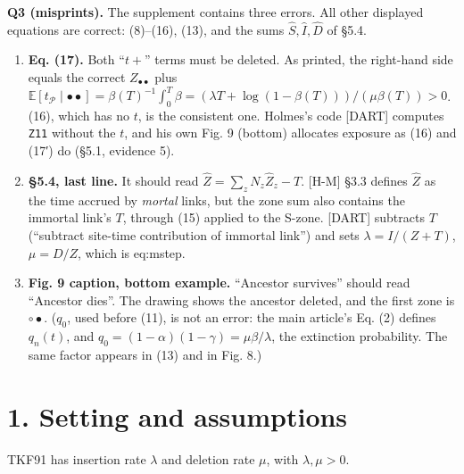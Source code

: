 \documentclass[10pt,]{article}
\providecommand{\tightlist}{%
  \setlength{\itemsep}{0pt}\setlength{\parskip}{0pt}}
\begin{document}
\textbf{Q3 (misprints).} The supplement contains three errors. All other
displayed equations are correct: (8)--(16), (13), and the sums
\(\hat S,\hat I,\hat D\) of §5.4.

\begin{enumerate}
\def\labelenumi{\arabic{enumi}.}
\tightlist
\item
  \textbf{Eq. (17).} Both ``\(t+\)'' terms must be deleted. As printed,
  the right-hand side equals the correct \(Z_{\bullet\bullet}\) plus
  \(\mathbb E[t_{\mathcal P}\mid\bullet\bullet]=\beta(T)^{-1}\int_0^T\beta=(\lambda T+\log(1-\beta(T)))/(\mu\beta(T))>0\).
  (16), which has no \(t\), is the consistent one. Holmes's code
  {[}DART{]} computes \texttt{Z11} without the \(t\), and his own Fig. 9
  (bottom) allocates exposure as (16) and (17′) do (§5.1, evidence 5).
\item
  \textbf{§5.4, last line.} It should read
  \(\hat Z=\sum_zN_z\hat Z_z-T\). {[}H-M{]} §3.3 defines \(\hat Z\) as
  the time accrued by \emph{mortal} links, but the zone sum also
  contains the immortal link's \(T\), through (15) applied to the
  S-zone. {[}DART{]} subtracts \(T\) (``subtract site-time contribution
  of immortal link'') and sets \(\lambda=I/(Z+T)\), \(\mu=D/Z\), which
  is eq:mstep.
\item
  \textbf{Fig. 9 caption, bottom example.} ``Ancestor survives'' should
  read ``Ancestor dies''. The drawing shows the ancestor deleted, and
  the first zone is \(\circ\bullet\). (\(q_0\), used before (11), is not
  an error: the main article's Eq. (2) defines \(q_n(t)\), and
  \(q_0=(1-\alpha)(1-\gamma)=\mu\beta/\lambda\), the extinction
  probability. The same factor appears in (13) and in Fig. 8.)
\end{enumerate}

\hypertarget{setting-and-assumptions}{%
\section{1. Setting and assumptions}\label{setting-and-assumptions}}

TKF91 has insertion rate \(\lambda\) and deletion rate \(\mu\), with
\(\lambda,\mu>0\).
\end{document}
